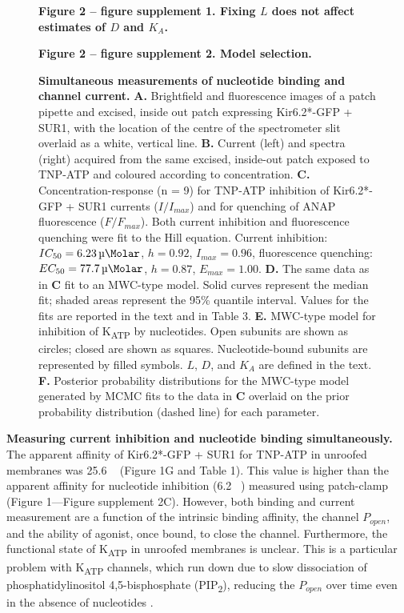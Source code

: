 \documentclass[9pt,lineno, onehalfspacing]{elife_modified}
\begin{document}
\begin{figure}\ContinuedFloat
\begin{fullwidth}
\caption{
\textbf{Simultaneous measurements of nucleotide binding and channel current.}
\textbf{A.}
Brightfield and fluorescence images of a patch pipette and excised, inside out patch expressing Kir6.2*-GFP + SUR1, with the location of the centre of the spectrometer slit overlaid as a white, vertical line.
\textbf{B.}
Current (left) and spectra (right) acquired from the same excised, inside-out patch exposed to TNP-ATP and coloured according to concentration.
\textbf{C.}
Concentration-response (n = 9) for TNP-ATP inhibition of Kir6.2*-GFP + SUR1 currents ($I/I_{max}$) and for quenching of ANAP fluorescence ($F/F_{max}$).
Both current inhibition and fluorescence quenching were fit to the Hill equation.
Current inhibition: $IC_{50} = \SI{6.23}{\micro\Molar}$, $h = 0.92$, $I_{max} = 0.96$, fluorescence quenching: $EC_{50} = \SI{77.7}{\micro\Molar}$, $h = 0.87$, $E_{max} = 1.00$.
\textbf{D.}
The same data as in \textbf{C} fit to an MWC-type model.
Solid curves represent the median fit; shaded areas represent the 95\% quantile interval.
Values for the fits are reported in the text and in Table 3.
\textbf{E.}
MWC-type model for inhibition of K\textsubscript{ATP} by nucleotides.
Open subunits are shown as circles; closed are shown as squares.
Nucleotide-bound subunits are represented by filled symbols. $L$, $D$, and $K_A$ are defined in the text.
\textbf{F.}
Posterior probability distributions for the MWC-type model generated by MCMC fits to the data in \textbf{C} overlaid on the prior probability distribution (dashed line) for each parameter.
}

\textbf{Figure 2 -- figure supplement 1. Fixing $L$ does not affect estimates of $D$ and $K_A$.}

\textbf{Figure 2 -- figure supplement 2. Model selection.}
\end{fullwidth}
\end{figure}

\textbf{Measuring current inhibition and nucleotide binding simultaneously.}
The apparent affinity of Kir6.2*-GFP + SUR1 for TNP-ATP in unroofed membranes was 25.6 \si{\micro\Molar} (Figure 1G and Table 1).
This value is higher than the apparent affinity for nucleotide inhibition (6.2 \si{\micro\Molar}) measured using patch-clamp (Figure 1—Figure supplement 2C).
However, both binding and current measurement are a function of the intrinsic binding affinity, the channel $P_{open}$, and the ability of agonist, once bound, to close the channel.
Furthermore, the functional state of K\textsubscript{ATP} in unroofed membranes is unclear. This is a particular problem with K\textsubscript{ATP} channels, which run down due to slow dissociation of phosphatidylinositol 4,5-bisphosphate (PIP\textsubscript{2}), reducing the $P_{open}$ over time even in the absence of nucleotides \citep{RN51}.
\end{document}
